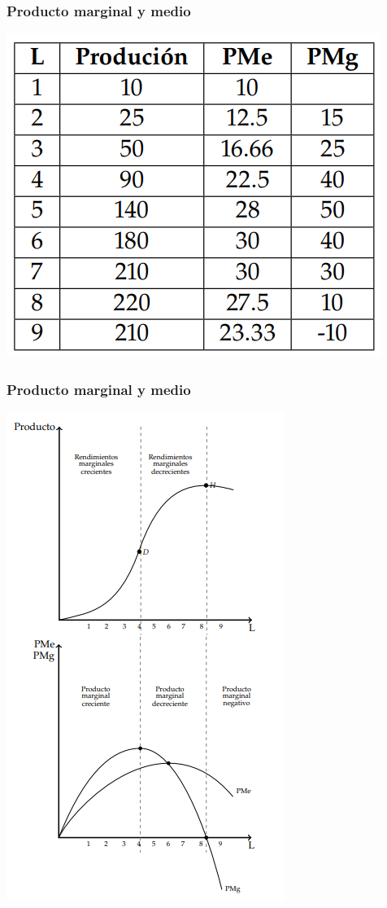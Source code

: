 \documentclass{beamer}
\begin{document}
\begin{frame}
\frametitle{Producto marginal y medio}
\centering
\includegraphics[scale=0.6]{../Figures/T12.3.png}
\end{frame}

\begin{frame}
    \frametitle{Producto marginal y medio}
    \centering
    \includegraphics[scale=0.65]{../Figures/C12.7.png}
\end{frame}
\end{document}
